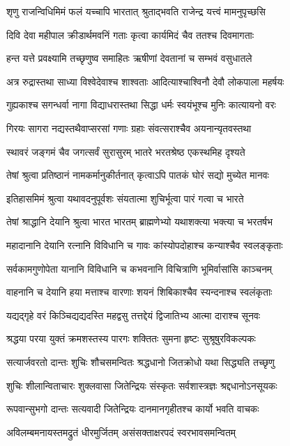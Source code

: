\twolineshloka
{शृणु राजन्विधिमिमं फलं यच्चापि भारतात्}
{श्रुताद्भवति राजेन्द्र यत्त्वं मामनुपृच्छसि}


\twolineshloka
{दिवि देवा महीपाल क्रीडार्थमवनिं गताः}
{कृत्वा कार्यमिदं चैव ततश्च दिवमागताः}


\twolineshloka
{हन्त यत्ते प्रवक्ष्यामि तच्छृणुष्व समाहितः}
{ऋषीणां देवतानां च सम्भवं वसुधातले}


\twolineshloka
{अत्र रुद्रास्तथा साध्या विश्वेदेवाश्च शाश्वताः}
{आदित्याश्चाश्विनौ देवौ लोकपाला महर्षयः}


\twolineshloka
{गुह्यकाश्च सगन्धर्वा नागा विद्याधरास्तथा}
{सिद्धा धर्मः स्वयंभूश्च मुनिः कात्यायनो वरः}


\twolineshloka
{गिरयः सागरा नद्यस्तथैवाप्सरसां गणाः}
{ग्रहाः संवत्सराश्चैव अयनान्यृतवस्तथा}


\twolineshloka
{स्थावरं जङ्गमं चैव जगत्सर्वं सुरासुरम्}
{भातरे भरतश्रेष्ठ एकस्थमिह दृश्यते}


\twolineshloka
{तेषां श्रुत्वा प्रतिष्ठानं नामकर्मानुकीर्तनात्}
{कृत्वाऽपि पातकं घोरं सद्यो मुच्येत मानवः}


\twolineshloka
{इतिहासमिमं श्रुत्वा यथावदनुपूर्वशः}
{संयतात्मा शुचिर्भूत्वा पारं गत्वा च भारते}


\twolineshloka
{तेषां श्राद्धानि देयानि श्रुत्वा भारत भारतम्}
{ब्राह्मणेभ्यो यथाशक्त्या भक्त्या च भरतर्षभ}


\twolineshloka
{महादानानि देयानि रत्नानि विविधानि च}
{गावः कांस्योपदोहाश्च कन्याश्चैव स्वलङ्कृताः}


\twolineshloka
{सर्वकामगुणोपेता यानानि विविधानि च}
{कभवनानि विचित्राणि भूमिर्वासांसि काञ्चनम्}


\twolineshloka
{वाहनानि च देयानि हया मत्ताश्च वारणाः}
{शयनं शिबिकाश्चैव स्यन्दनाश्च स्वलंकृताः}


\twolineshloka
{यद्यद्गृहे वरं किञ्चिद्यद्यदस्ति महद्वसु}
{तत्तद्देयं द्विजातिभ्य आत्मा दाराश्च सूनवः}


\twolineshloka
{श्रद्धया परया युक्तं क्रमशस्तस्य पारगः}
{शक्तितः सुमना हृष्टः सुश्रूषुरविकल्पकः}


\twolineshloka
{सत्यार्जवरतो दान्तः शुचिः शौचसमन्वितः}
{श्रद्धधानो जितक्रोधो यथा सिद्ध्यति तच्छृणु}


\twolineshloka
{शुचिः शीलान्विताचारः शुक्लवासा जितेन्द्रियः}
{संस्कृतः सर्वशास्त्रज्ञः श्रद्दधानोऽनसूयकः}


\twolineshloka
{रूपवान्सुभगो दान्तः सत्यवादी जितेन्द्रियः}
{दानमानगृहीतश्च कार्यो भवति वाचकः}


\twolineshloka
{अविलम्बमनायस्तमद्रुतं धीरमुर्जितम्}
{असंसक्ताक्षरपदं स्वरभावसमन्वितम्}


